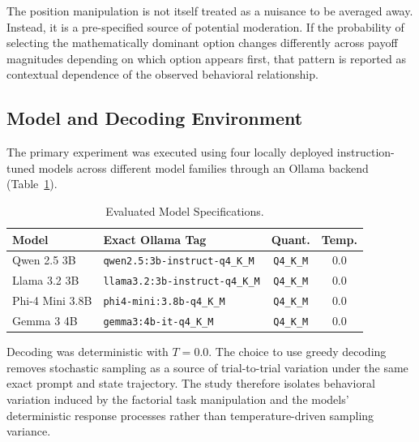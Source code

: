 \documentclass[10pt,journal,compsoc]{IEEEtran}
\begin{document}
The position manipulation is not itself treated as a nuisance to be averaged away. Instead, it is a pre-specified source of potential moderation. If the probability of selecting the mathematically dominant option changes differently across payoff magnitudes depending on which option appears first, that pattern is reported as contextual dependence of the observed behavioral relationship.

\subsection{Model and Decoding Environment}
The primary experiment was executed using four locally
deployed instruction-tuned models across different model
families through an Ollama backend (Table~\ref{tab:models}).

\begin{table}[!t]
\centering
\caption{Evaluated Model Specifications.}
\label{tab:models}
\scriptsize
\setlength{\tabcolsep}{2.5pt}
\begin{tabular}{@{}lp{3.0cm}cc@{}}
\toprule
\textbf{Model} & \textbf{Exact Ollama Tag} & \textbf{Quant.} & \textbf{Temp.} \\
\midrule
Qwen 2.5 3B &
\texttt{qwen2.5:3b-instruct-}\newline\texttt{q4\_K\_M} &
\texttt{Q4\_K\_M} & 0.0 \\

Llama 3.2 3B &
\texttt{llama3.2:3b-instruct-}\newline\texttt{q4\_K\_M} &
\texttt{Q4\_K\_M} & 0.0 \\

Phi-4 Mini 3.8B &
\texttt{phi4-mini:3.8b-}\newline\texttt{q4\_K\_M} &
\texttt{Q4\_K\_M} & 0.0 \\

Gemma 3 4B &
\texttt{gemma3:4b-it-}\newline\texttt{q4\_K\_M} &
\texttt{Q4\_K\_M} & 0.0 \\

\bottomrule
\end{tabular}
\end{table}

Decoding was deterministic with $T=0.0$. The choice to use greedy decoding removes stochastic sampling as a source of trial-to-trial variation under the same exact prompt and state trajectory. The study therefore isolates behavioral variation induced by the factorial task manipulation and the models' deterministic response processes rather than temperature-driven sampling variance.
\end{document}
